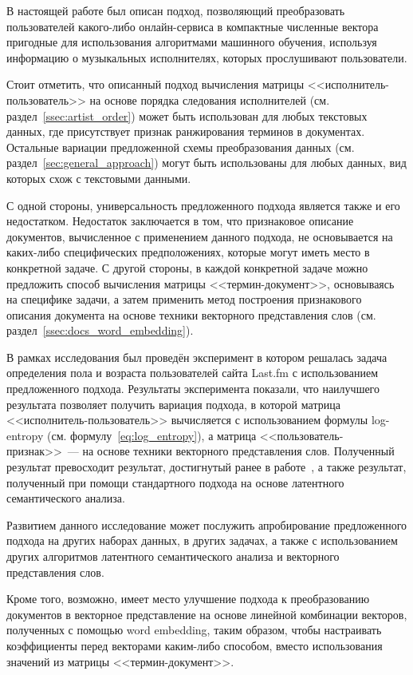 \startconclusionpage
В настоящей работе был описан подход, позволяющий преобразовать
пользователей какого-либо онлайн-сервиса в компактные
численные вектора пригодные для использования алгоритмами машинного обучения,
используя информацию о музыкальных исполнителях, которых прослушивают
пользователи.

Стоит отметить, что описанный подход вычисления матрицы
<<исполнитель-пользователь>> на основе порядка следования исполнителей (см. 
раздел~\ref{ssec:artist_order}) может быть использован для
любых текстовых данных, где присутствует признак ранжирования
терминов в документах. Остальные вариации предложенной схемы
преобразования данных (см. раздел~\ref{sec:general_approach})
могут быть использованы для любых данных, вид которых схож с
текстовыми данными.

С одной стороны, универсальность предложенного подхода является также
и его недостатком. Недостаток заключается в том, что признаковое
описание документов, вычисленное с применением данного подхода,
не основывается на каких-либо специфических предположениях, которые
могут иметь место в конкретной задаче. С другой стороны, в каждой
конкретной задаче можно предложить способ вычисления матрицы
<<термин-документ>>, основываясь на специфике задачи, а затем
применить метод построения признакового описания документа на
основе техники векторного представления слов (см. 
раздел~\ref{ssec:docs_word_embedding}).

В рамках исследования был проведён эксперимент в котором решалась
задача определения пола и возраста пользователей сайта Last.fm с
использованием предложенного подхода. Результаты эксперимента
показали, что наилучшего результата позволяет получить вариация
подхода, в которой матрица <<исполнитель-пользователь>> вычисляется
с использованием формулы log-entropy (см. формулу~\ref{eq:log_entropy}),
а матрица <<пользователь-признак>>~--- на основе техники векторного
представления слов. Полученный результат превосходит результат,
достигнутый ранее в работе~\cite{wu2014gender}, а также результат,
полученный при помощи стандартного подхода на основе латентного
семантического анализа.

Развитием данного исследование может послужить апробирование 
предложенного подхода на других наборах данных, в других задачах,
а также с использованием других алгоритмов латентного семантического
анализа и векторного представления слов.

Кроме того, возможно, имеет место улучшение подхода к преобразованию
документов в векторное представление на основе линейной комбинации
векторов, полученных с помощью word embedding, таким образом, чтобы
настраивать коэффициенты перед векторами каким-либо способом, вместо
использования значений из матрицы <<термин-документ>>.

